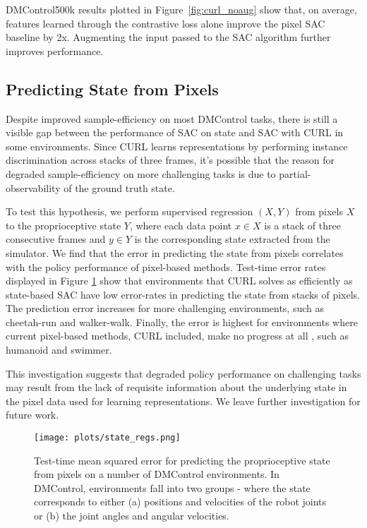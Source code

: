 \documentclass{article}
\begin{document}
DMControl500k results plotted in Figure~\ref{fig:curl_noaug} show that, on average, features learned through the contrastive loss alone improve the pixel SAC baseline by 2x. Augmenting the input passed to the SAC algorithm further improves performance.

\subsection{Predicting State from Pixels}

Despite improved sample-efficiency on most DMControl tasks, there is still a visible gap between the performance of SAC on state and SAC with CURL in some environments. Since CURL learns representations by performing instance discrimination across stacks of three frames, it's possible that the reason for degraded sample-efficiency on more challenging tasks is due to partial-observability of the ground truth state. 

To test this hypothesis, we perform supervised regression $(X,Y)$ from pixels $X$ to the proprioceptive state $Y$, where each data point $x \in X$ is a stack of three consecutive frames and $y \in Y$ is the corresponding state extracted from the simulator. We find that the error in predicting the state from pixels correlates with the policy performance of pixel-based methods. Test-time error rates displayed in Figure \ref{fig:statereg} show that environments that CURL solves as efficiently as state-based SAC have low error-rates in predicting the state from stacks of pixels. The prediction error increases for more challenging environments, such as cheetah-run and walker-walk. Finally, the error is highest for environments where current pixel-based methods, CURL included, make no progress at all \cite{tassa2018deepmind}, such as humanoid and swimmer.

This investigation suggests that degraded policy performance on challenging tasks may result from the lack of requisite information about the underlying state in the pixel data used for learning representations. We leave further investigation for future work.

\begin{figure}[!ht]
\begin{center}
\centerline{\texttt{[image: plots/state\_regs.png]}}
\caption{Test-time mean squared error for predicting the proprioceptive state from pixels on a number of DMControl environments. In DMControl, environments fall into two groups - where the state corresponds to either (a) positions and velocities of the robot joints or (b) the joint angles and angular velocities.}
   \label{fig:statereg}
\end{center}
\vskip -0.2in
\end{figure}
\end{document}
